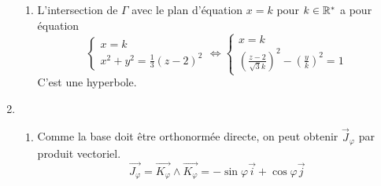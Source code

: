 \begin{enumerate}
\begin{enumerate}
\item \label{2} L'intersection de $\Gamma$ avec le plan d'équation $x=k$ pour $k\in\mathbb{R}^*$ a pour équation
\begin{displaymath}
\left\{\begin{array}{l} x=k\\ x^2+y^2=\frac 13 (z-2)^2
\end{array}\right. 
\Leftrightarrow
\left\{\begin{array}{l} x=k \\ \left(\frac {z-2}{\sqrt{3}k}\right)^2-\left(\frac yk\right)^2=1\end{array}\right. 
\end{displaymath}
 C'est une hyperbole.
\end{enumerate}
\item
\begin{enumerate}
\item Comme la base doit être orthonormée directe, on peut obtenir $\overrightarrow J_\varphi$ par produit vectoriel.
\begin{displaymath}
 \overrightarrow{J_\varphi}=
\overrightarrow{K_\varphi}\wedge\overrightarrow{K_\varphi}
=-\sin\varphi\overrightarrow{i}+\cos\varphi\overrightarrow{j}
\end{displaymath}


\end{enumerate}
\end{enumerate}
